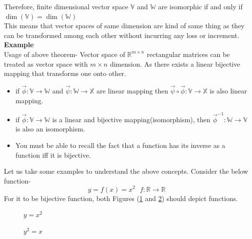 \documentclass{article}
\begin{document}
Therefore, finite dimensional vector space $\mathbb{V}$ and $\mathbb{W}$ are isomorphic if and only if $\dim(\mathbb{V}) = \dim(\mathbb{W})$\\
This means that vector spaces of same dimension are kind of same thing as they can be transformed among each other without incurring any loss or increment.\\
\textbf{Example}\\
Usage of above theorem- Vector space of $\mathbb{R}^{m\times n}$ rectangular matrices can be treated as vector space with $m\times n$ dimension. As there exists a linear bijective mapping that transforms one onto other.
\begin{itemize}
    \item if $\vec{\phi}\colon \mathbb{V}\longrightarrow\mathbb{W}$ and $\vec{\psi}\colon \mathbb{W}\longrightarrow\mathbb{X}$ are linear mapping then $\vec{\psi}\circ\vec{\phi}\colon \mathbb{V}\longrightarrow\mathbb{X}$ is also linear mapping.
    \item if $\vec{\phi}\colon \mathbb{V}\longrightarrow\mathbb{W}$ is a linear and bijective mapping(isomorphism), then $\vec{\phi} ^{-1}\colon \mathbb{W}\longrightarrow \mathbb{V}$ is also an isomorphism.
    \item You must be able to recall the fact that a function has its inverse as a function iff it is bijective.
\end{itemize}
Let us take some examples to understand the above concepts. Consider the below function-
\[y = f(x) = x^2  ~~~ f\colon\mathbb{R}\longrightarrow\mathbb{R}\]
For it to be bijective function, both Figures (\ref{fig:sqr} and \ref{fig:sqrt}) should depict functions.
\begin{figure}
    \centering
{}
\caption{$y=x^2$} \label{fig:sqr}
\end{figure}

\begin{figure}
    \centering
{}
\caption{$y^2=x$}
    \label{fig:sqrt}
\end{figure}
\end{document}
